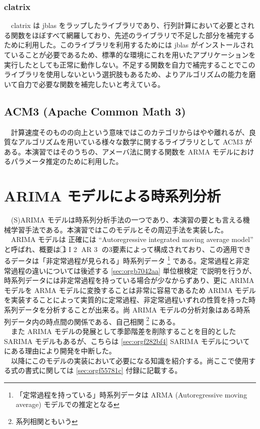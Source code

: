 \documentclass{scrartcl}
\begin{document}
\subsubsection{clatrix}
\label{sec:orgc003192}
　clatrix は jblas をラップしたライブラリであり、行列計算において必要とされる関数をほぼすべて網羅しており、先述のライブラリで不足した部分を補完するために利用した。このライブラリを利用するためには jblas がインストールされていることが必要であるため、標準的な環境にこれを用いたアプリケーションを実行したとしても正常に動作しない。不足する関数を自力で補完することでこのライブラリを使用しないという選択肢もあるため、よりアルゴリズムの能力を磨いて自力で必要な関数を補完したいと考えている。\\

\subsection{ACM3 (Apache Common Math 3)}
\label{sec:org52d9eac}
　計算速度そのものの向上という意味ではこのカテゴリからはやや離れるが、良質なアルゴリズムを用いている様々な数学に関するライブラリとして ACM3 がある。本演習ではそのうちの、アメーバ法に関する関数を ARMA モデルにおけるパラメータ推定のために利用した。\\
\section{ARIMA モデルによる時系列分析}
\label{sec:org73bc3ce}
　(S)ARIMA モデルは時系列分析手法の一つであり、本演習の要とも言える機械学習手法である。本演習ではこのモデルとその周辺手法を実装した。\\
　ARIMA モデルは 正確には ``Autoregressive integrated moving average model'' と呼ばれ、概要は \textcircled{\scriptsize 1} I \textcircled{\scriptsize 2} AR \textcircled{\scriptsize 3} の3要素によって構成されており、この適用できるデータは「非定常過程が見られる」時系列データ \footnote{「定常過程を持っている」時系列データは ARMA (Autoregressive moving average) モデルでの推定となる} である。定常過程と非定常過程の違いについては後述する \ref{sec:orgb7042aa} 単位根検定 で説明を行うが、時系列データには非定常過程を持っている場合が少なからずあり、更に ARIMA モデルを ARMA モデルに変換することは非常に容易であるため ARIMA モデルを実装することによって実質的に定常過程、非定常過程いずれの性質を持った時系列データを分析することが出来る。尚 ARIMA モデルの分析対象はある時系列データ内の時点間の関係である、自己相関 \footnote{系列相関ともいう} にある。\\
　また ARIMA モデルの発展として季節階差を削除することを目的とした SARIMA モデルもあるが、こちらは \ref{sec:orgf282bf4} SARIMA モデルについて にある理由により開発を中断した。\\
　以降にこのモデルの実装において必要になる知識を紹介する。尚ここで使用する式の書式に関しては \ref{sec:orgf55781c} 付録に記載する。\\
\end{document}
